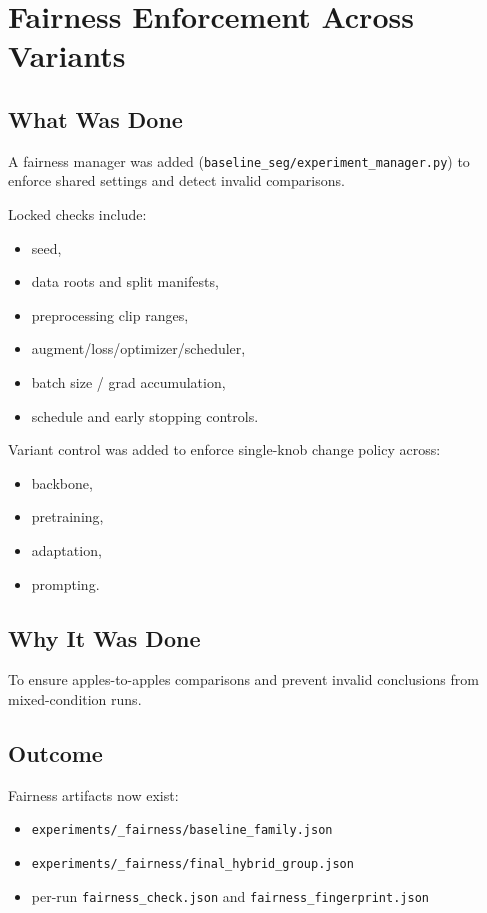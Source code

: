 \documentclass[11pt,a4paper]{article}
\begin{document}
\section{Fairness Enforcement Across Variants}
\subsection{What Was Done}
A fairness manager was added (\texttt{baseline\_seg/experiment\_manager.py}) to enforce shared settings and detect invalid comparisons.

Locked checks include:
\begin{itemize}[leftmargin=1.5em]
  \item seed,
  \item data roots and split manifests,
  \item preprocessing clip ranges,
  \item augment/loss/optimizer/scheduler,
  \item batch size / grad accumulation,
  \item schedule and early stopping controls.
\end{itemize}

Variant control was added to enforce single-knob change policy across:
\begin{itemize}[leftmargin=1.5em]
  \item backbone,
  \item pretraining,
  \item adaptation,
  \item prompting.
\end{itemize}

\subsection{Why It Was Done}
To ensure apples-to-apples comparisons and prevent invalid conclusions from mixed-condition runs.

\subsection{Outcome}
Fairness artifacts now exist:
\begin{itemize}[leftmargin=1.5em]
  \item \texttt{experiments/\_fairness/baseline\_family.json}
  \item \texttt{experiments/\_fairness/final\_hybrid\_group.json}
  \item per-run \texttt{fairness\_check.json} and \texttt{fairness\_fingerprint.json}
\end{itemize}
\end{document}

